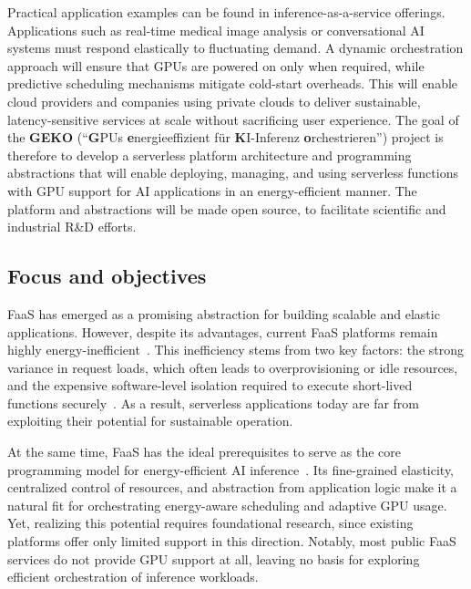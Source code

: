 Practical application examples can be found in inference-as-a-service offerings.
Applications such as real-time medical image analysis or conversational AI systems must respond elastically to fluctuating demand.
A dynamic orchestration approach will ensure that GPUs are powered on only when required, while predictive scheduling mechanisms mitigate cold-start overheads.
This will enable cloud providers and companies using private clouds to deliver sustainable, latency-sensitive services at scale without sacrificing user experience.
The goal of the \textbf{GEKO} (\enquote{\textbf{G}PUs \textbf{e}nergieeffizient für \textbf{K}I-Inferenz \textbf{o}rchestrieren}) project is therefore to develop a serverless platform architecture and programming abstractions that will enable deploying, managing, and using serverless functions with GPU support for AI applications in an energy-efficient manner.
The platform and abstractions will be made open source, to facilitate scientific and industrial R\&D efforts.

\subsection{Focus and objectives}

FaaS has emerged as a promising abstraction for building scalable and elastic applications.
However, despite its advantages, current FaaS platforms remain highly energy-inefficient~\cite{sharma_challenges_2023}. 
This inefficiency stems from two key factors: the strong variance in request loads, which often leads to overprovisioning or idle resources, and the expensive software-level isolation required to execute short-lived functions securely~\cite{schirmer2023nightshift,ginzburg_serverless_2020}.
As a result, serverless applications today are far from exploiting their potential for sustainable operation.

At the same time, FaaS has the ideal prerequisites to serve as the core programming model for energy-efficient AI inference~\cite{patros_2021_towards_sustainable_serverless}.
Its fine-grained elasticity, centralized control of resources, and abstraction from application logic make it a natural fit for orchestrating energy-aware scheduling and adaptive GPU usage. 
Yet, realizing this potential requires foundational research, since existing platforms offer only limited support in this direction. 
Notably, most public FaaS services do not provide GPU support at all, leaving no basis for exploring efficient orchestration of inference workloads.


